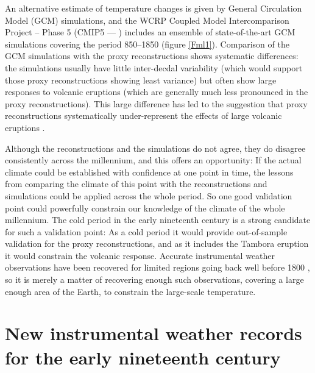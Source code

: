 \documentclass[CP]{copernicus}
\begin{document}
An alternative estimate of temperature changes is given by General Circulation Model (GCM) simulations, and the WCRP Coupled Model Intercomparison Project – Phase 5 (CMIP5 --- \citet{taylor12cmip5}) includes an ensemble of state-of-the-art GCM simulations covering the period 850--1850 (figure \ref{Fml1}). Comparison of the GCM simulations with the proxy reconstructions shows systematic differences: the simulations usually have little inter-decdal variability (which would support those proxy reconstructions showing least variance) but often show large responses to volcanic eruptions (which are generally much less pronounced in the proxy reconstructions). This large difference has led to the suggestion that proxy reconstructions systematically under-represent the effects of large volcanic eruptions \citep{mann12volctreering}.

Although the reconstructions and the simulations do not agree, they do disagree consistently across the millennium, and this offers an opportunity: If the actual climate could be established with confidence at one point in time, the lessons from comparing the climate of this point with the reconstructions and simulations could be applied across the whole period. So one good validation point could powerfully constrain our knowledge of the climate of the whole millennium. The cold period in the early nineteenth century is a strong candidate for such a validation point: As a cold period it would provide out-of-sample validation for the proxy reconstructions, and as it includes the Tambora eruption it would constrain the volcanic response. Accurate instrumental weather observations have been recovered for limited regions going back well before 1800 \citep{camuffo11medici,alcoforado12portobs}, so it is merely a matter of recovering enough such observations, covering a large enough area of the Earth, to constrain the large-scale temperature.

\section{New instrumental weather records for the early nineteenth century}
\end{document}
